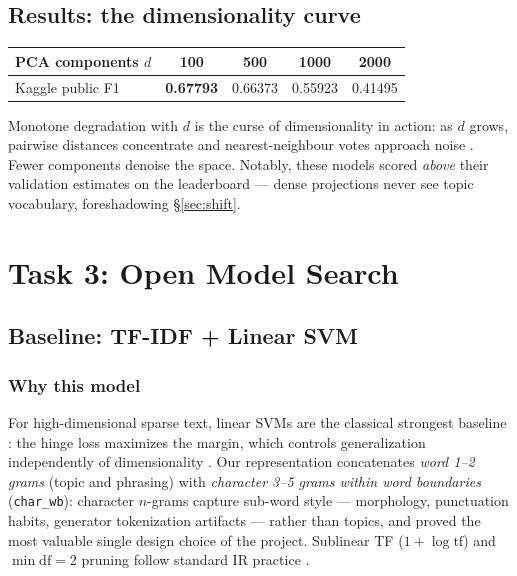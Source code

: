 \documentclass[11pt,a4paper]{article}
\begin{document}
\subsection{Results: the dimensionality curve}
\begin{center}
\begin{tabular}{lcccc}
\toprule
PCA components $d$ & 100 & 500 & 1000 & 2000\\
\midrule
Kaggle public F1 & \textbf{0.67793} & 0.66373 & 0.55923 & 0.41495\\
\bottomrule
\end{tabular}
\end{center}
Monotone degradation with $d$ is the curse of dimensionality in action: as $d$ grows, pairwise distances concentrate and nearest-neighbour votes approach noise \cite{beyer1999}. Fewer components denoise the space. Notably, these models scored \emph{above} their validation estimates on the leaderboard --- dense projections never see topic vocabulary, foreshadowing \S\ref{sec:shift}.

\section{Task 3: Open Model Search}\label{sec:task3}

\subsection{Baseline: TF-IDF + Linear SVM}\label{sec:baseline}

\subsubsection{Why this model}
For high-dimensional sparse text, linear SVMs are the classical strongest baseline \cite{joachims1998, fan2008}: the hinge loss maximizes the margin, which controls generalization independently of dimensionality \cite{cortes1995}. Our representation concatenates \emph{word 1--2 grams} (topic and phrasing) with \emph{character 3--5 grams within word boundaries} (\texttt{char\_wb}): character $n$-grams capture sub-word style --- morphology, punctuation habits, generator tokenization artifacts --- rather than topics, and proved the most valuable single design choice of the project. Sublinear TF ($1 + \log \text{tf}$) and $\min\text{df}=2$ pruning follow standard IR practice \cite{manning2008, salton1988}.
\end{document}
